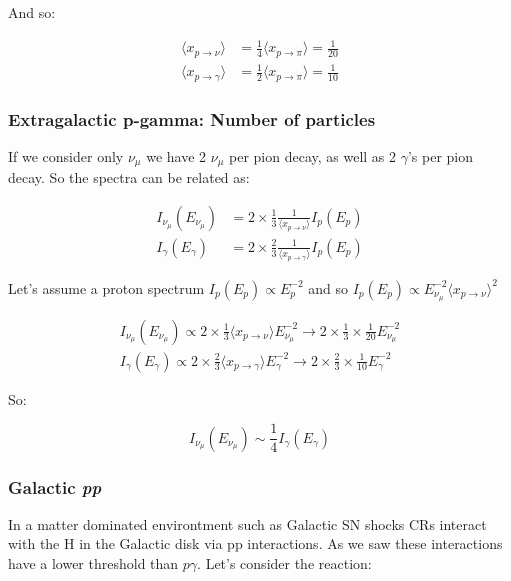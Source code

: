 \documentclass[
  letterpaper,
  DIV=11,
  numbers=noendperiod]{scrreprt}
\begin{document}
And so:

\[\begin{aligned}
\langle x_{p\rightarrow\nu}\rangle &= \frac{1}{4}\langle x_{p\rightarrow\pi}\rangle =\frac{1}{20}\\
\langle x_{p\rightarrow\gamma}\rangle &= \frac{1}{2}\langle x_{p\rightarrow\pi}\rangle =\frac{1}{10}
\end{aligned}\]

\subsubsection{Extragalactic p-gamma: Number of
particles}\label{extragalactic-p-gamma-number-of-particles}

If we consider only \(\nu_\mu\) we have 2 \(\nu_\mu\) per pion decay, as
well as 2 \(\gamma\)'s per pion decay. So the spectra can be related as:

\[\begin{aligned}
    I_{\nu_\mu}(E_{\nu_\mu}) &= 2 \times \frac{1}{3} \frac{1}{\langle x_{p\rightarrow\nu}\rangle} I_{p}(E_{p})\\
    I_{\gamma}(E_{\gamma}) &= 2\times \frac{2}{3} \frac{1}{\langle x_{p\rightarrow\gamma}\rangle}I_{p}(E_{p})
\end{aligned}\]

Let's assume a proton spectrum \(I_p(E_p) \propto E_p^{-2}\) and so
\(I_p(E_p)\propto E_{\nu_\mu}^{-2}\langle x_{p\rightarrow\nu}\rangle^2\)

\[\begin{aligned}
    I_{\nu_\mu}(E_{\nu_\mu}) \propto 2 \times \frac{1}{3} \langle x_{p\rightarrow\nu}\rangle E_{\nu_\mu}^{-2} \rightarrow 2 \times \frac{1}{3} \times \frac{1}{20} E_{\nu_\mu}^{-2}\\
    I_\gamma(E_\gamma) \propto 2 \times \frac{2}{3}\langle x_{p\rightarrow\gamma}\rangle  E_\gamma^{-2} \rightarrow  2 \times \frac{2}{3} \times \frac{1}{10} E_{\gamma}^{-2}
\end{aligned}\]

So:

\[I_{\nu_\mu} (E_{\nu_\mu}) \sim \frac{1}{4} I_{\gamma}(E_\gamma)\]

\subsubsection{\texorpdfstring{Galactic
\emph{pp}}{Galactic pp}}\label{galactic-pp}

In a matter dominated environtment such as Galactic SN shocks CRs
interact with the H in the Galactic disk via pp interactions. As we saw
these interactions have a lower threshold than \(p\gamma\). Let's
consider the reaction:
\end{document}
